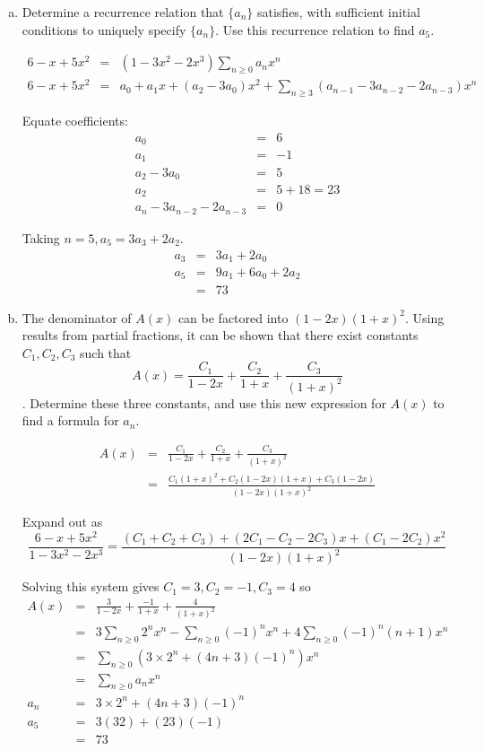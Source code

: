 \documentclass{article}
\begin{document}
\begin{enumerate}[a)]
	\item Determine a recurrence relation that $\{a_n\}$ satisfies, with sufficient initial conditions to uniquely specify $\{a_n\}$. Use this recurrence relation to find $a_5$.
	
	\begin{eqnarray*}
		6 -x + 5x^2 &=& (1-3x^2-2x^3) \sum_{n \ge 0} a_nx^n \\
		6 -x + 5x^2 &=& a_0 + a_1x + (a_2-3a_0)x^2 + \sum_{n \ge 3}(a_{n-1} - 3a_{n-2} - 2a_{n-3})x^n
	\end{eqnarray*}
	
	Equate coefficients:
	\begin{eqnarray*}
		a_0 &=& 6 \\
		a_1 &=& -1 \\
		a_2 - 3a_0 &=& 5 \\
		a_2 &=& 5 + 18 = 23 \\
		a_n - 3a_{n-2} - 2a_{n-3} &=& 0
	\end{eqnarray*}
	
	Taking $n=5, a_5 = 3a_3 + 2a_2$.
	\begin{eqnarray*}
		a_3 &=& 3a_1 + 2a_0 \\
		a_5 &=& 9a_1 + 6a_0 + 2a_2 \\
		&=& 73
	\end{eqnarray*}
	
	\item The denominator of $A(x)$ can be factored into $(1-2x)(1+x)^2$. Using results from partial fractions, it can be shown that there exist constants $C_1, C_2, C_3$ such that $$A(x) = \frac{C_1}{1-2x} + \frac{C_2}{1+x} + \frac{C_3}{(1+x)^2}$$. Determine these three constants, and use this new expression for $A(x)$ to find a formula for $a_n$.
	
	\begin{eqnarray*}
		A(x) &=& \frac{C_1}{1-2x} + \frac{C_2}{1+x} + \frac{C_3}{(1+x)^2} \\
		&=& \frac{C_1(1+x)^2 + C_2(1-2x)(1+x) + C_3(1-2x)}{(1-2x)(1+x)^2}
	\end{eqnarray*}
	
	Expand out as $$\frac{6 -x + 5x^2}{1-3x^2-2x^3} = \frac{(C_1+C_2+C_3) + (2C_1-C_2-2C_3)x + (C_1-2C_2)x^2}{(1-2x)(1+x)^2}$$
	
	Solving this system gives $C_1=3,C_2=-1,C_3=4$ so
	\begin{eqnarray*}
		A(x) &=& \frac{3}{1-2x} + \frac{-1}{1+x} + \frac{4}{(1+x)^2}\\
		&=& 3 \sum_{n \ge 0}2^nx^n - \sum_{n \ge 0}(-1)^nx^n + 4 \sum_{n \ge 0} (-1)^n(n+1)x^n\\
		&=& \sum_{n \ge 0} \left(3 \times 2^n + (4n+3)(-1)^n \right)x^n\\
		&=& \sum_{n \ge 0} a_nx^n \\
		a_n &=& 3 \times 2^n + (4n+3)(-1)^n\\
		a_5 &=& 3(32) + (23)(-1) \\
		&=& 73
	\end{eqnarray*}
	
\end{enumerate}
\end{document}
